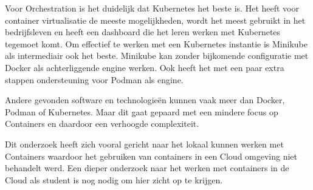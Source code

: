 Voor Orchestration is het duidelijk dat Kubernetes het beste is. Het heeft voor container virtualisatie de meeste mogelijkheden, wordt het meest gebruikt in het bedrijfsleven en heeft een dashboard die het leren werken met Kubernetes tegemoet komt. Om effectief te werken met een Kubernetes instantie is Minikube als intermediair ook het beste. Minikube kan zonder bijkomende configuratie met Docker als achterliggende engine werken. Ook heeft het met een paar extra stappen ondersteuning voor Podman als engine.

Andere gevonden software en technologieën kunnen vaak meer dan Docker, Podman of Kubernetes. Maar dit gaat gepaard met een mindere focus op Containers en daardoor een verhoogde complexiteit.

Dit onderzoek heeft zich vooral gericht naar het lokaal kunnen werken met Containers waardoor het gebruiken van containers in een Cloud omgeving niet behandelt werd. Een dieper onderzoek naar het werken met containers in de Cloud als student is nog nodig om hier zicht op te krijgen. 




